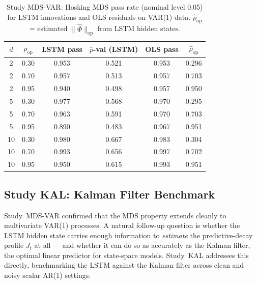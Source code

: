 \documentclass[bj,authoryear]{imsart}
\theoremstyle{plain}
\theoremstyle{definition}
\begin{document}
\begin{table}[t]
\centering
\caption{Study MDS-VAR: Hosking MDS pass rate (nominal level 0.05) for LSTM
  innovations and OLS residuals on VAR(1) data.
  $\hat{\rho}_{\mathrm{op}}$ = estimated $\|\hat\Phi\|_{\mathrm{op}}$ from LSTM hidden states.}
\label{tab:mds-var}
\small
\begin{tabular}{cccccc}
\toprule
$d$ & $\rho_{\mathrm{op}}$ & LSTM pass & $\bar{p}$-val (LSTM) & OLS pass & $\hat\rho_{\mathrm{op}}$ \\
\midrule
2 & 0.30 & 0.953 & 0.521 & 0.953 & 0.296 \\
2 & 0.70 & 0.957 & 0.513 & 0.957 & 0.703 \\
2 & 0.95 & 0.940 & 0.498 & 0.957 & 0.950 \\
\midrule
5 & 0.30 & 0.977 & 0.568 & 0.970 & 0.295 \\
5 & 0.70 & 0.963 & 0.591 & 0.970 & 0.703 \\
5 & 0.95 & 0.890 & 0.483 & 0.967 & 0.951 \\
\midrule
10 & 0.30 & 0.980 & 0.667 & 0.983 & 0.304 \\
10 & 0.70 & 0.993 & 0.656 & 0.997 & 0.702 \\
10 & 0.95 & 0.950 & 0.615 & 0.993 & 0.951 \\
\bottomrule
\end{tabular}
\end{table}

\subsection{Study KAL: Kalman Filter Benchmark}
\label{sec:kal}

Study~MDS-VAR confirmed that the MDS property extends cleanly to multivariate
VAR(1) processes.
A natural follow-up question is whether the LSTM hidden state carries
enough information to \emph{estimate} the predictive-decay profile $J_t$
at all --- and whether it can do so as accurately as the Kalman filter,
the optimal linear predictor for state-space models.
Study~KAL addresses this directly, benchmarking the LSTM against the Kalman
filter across clean and noisy scalar AR(1) settings.
\end{document}
